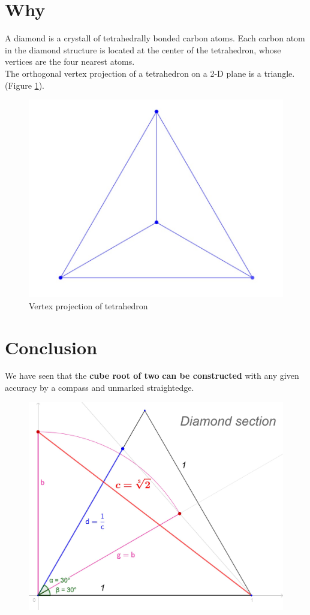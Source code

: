 \documentclass[12pt, letterpaper, oneside]{report}
\begin{document}
\section {Why}
A diamond is a crystall of tetrahedrally bonded carbon atoms.
Each carbon atom in the diamond structure is located at the center of the tetrahedron, whose vertices are the four nearest atoms.\cite{B}
\\
The orthogonal vertex projection of a tetrahedron on a 2-D plane is a triangle. (Figure \ref{fig:tetrahedron}).
\begin{figure}[h]
	\centering
	\includegraphics[width=0.3\linewidth]{images/tetrahedron}
	\caption{Vertex projection of tetrahedron}
	\label{fig:tetrahedron}
\end{figure}


\section{Conclusion}
\begin{center}
	We have seen that the \textbf{cube root of two} \textbf{can be constructed} with any given accuracy by a compass and unmarked straightedge.
\end{center}



\begin{figure}[h]
	\centering
	\includegraphics[width=0.6\linewidth]{images/ds_def.jpg}
	
	\label{fig:Diamond Section}
\end{figure}
\end{document}
